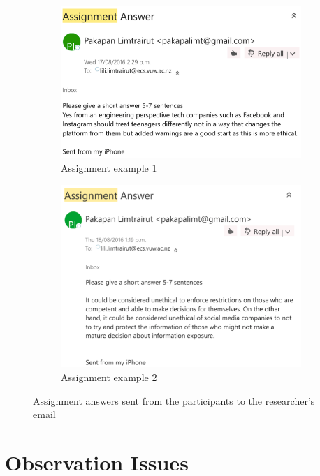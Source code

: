 \begin{figure}[H]\centering
    \begin{subfigure}{0.8\textwidth}
 \includegraphics[width=\textwidth]{p1ql6a}
 \caption{Assignment example 1}
    \end{subfigure}\hspace{0.1\textwidth}
    \begin{subfigure}{0.8\textwidth}
\includegraphics[width=\textwidth]{p1ql6b}
  \caption{Assignment example 2}
    \end{subfigure}
    \caption{Assignment answers sent from the participants to the researcher's email}
\end{figure}


\section{Observation Issues}

